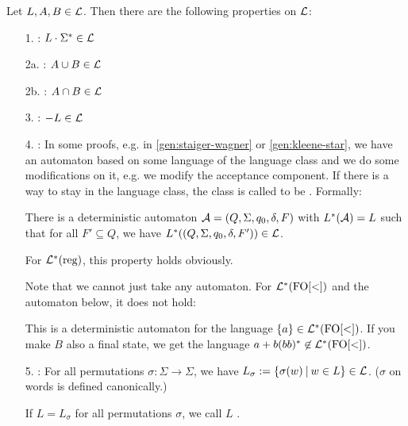 Let $L,A,B \in \mathcal{L}$. Then there are the following properties on $\mathcal{L}$:
\begin{enumerate}
\item[1.] : $L \cdot \Sigma^* \in \mathcal{L}$
\item[2a.] : $A \cup B \in \mathcal{L}$
\item[2b.] : $A \cap B \in \mathcal{L}$
\item[3.] : $- L \in \mathcal{L}$

\item[4.]
:
In some proofs, e.g. in \ref{gen:staiger-wagner} or \ref{gen:kleene-star}, we have an automaton based on some language of the language class and we do some modifications on it, e.g. we modify the acceptance component. If there is a way to stay in the language class, the class is called to be . Formally:

There is a deterministic automaton $\mathcal{A} = (Q,\Sigma,q_0,\delta,F)$ with $L^*(\mathcal{A}) = L$ such that for all $F' \subseteq Q$, we have $L^*((Q,\Sigma,q_0,\delta,F')) \in \mathcal{L}$.

For $\mathcal{L}^*(\text{reg})$, this property holds obviously.

Note that we cannot just take any automaton. For $\mathcal{L}^*(\mathrm{FO[<]})$ and the automaton below, it does not hold:

  
This is a deterministic automaton for the language $\Set{a} \in \Lang^*(\mathrm{FO[<]})$. If you make $B$ also a final state, we get the language $a + b(bb)^* \not\in \mathcal{L}^*(\mathrm{FO[<]})$.


\item[5.] : For all permutations $\sigma : \Sigma \rightarrow \Sigma$, we have $L_\sigma := \Set{\sigma(w)}{w \in L} \in \Lang$. ($\sigma$ on words is defined canonically.)

If $L = L_\sigma$ for all permutations $\sigma$, we call $L$ .

\end{enumerate}


